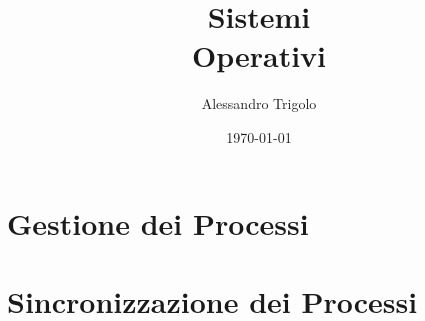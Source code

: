 \documentclass[titlepage]{article}
\title{\textbf{\fontsize{35pt}{35pt}\selectfont Sistemi\\\vspace{25pt}Operativi}}
\author{Alessandro Trigolo}
\date{\today}
\begin{document}
\maketitle

\newpage\tableofcontents

\newpage\listoffigures

\newpage\lstlistoflistings

\listoftodos


\lstset{style = C++}

\part{Gestione dei Processi}








\part{Sincronizzazione dei Processi}







\end{document}
